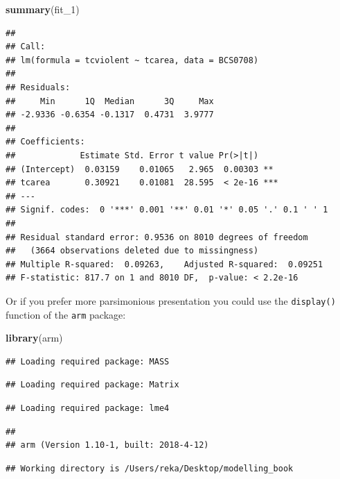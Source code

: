 \documentclass[]{book}
\newenvironment{Shaded}{\begin{snugshade}}{\end{snugshade}}
\newcommand{\DecValTok}[1]{\textcolor[rgb]{0.00,0.00,0.81}{#1}}
\newcommand{\KeywordTok}[1]{\textcolor[rgb]{0.13,0.29,0.53}{\textbf{#1}}}
\newcommand{\NormalTok}[1]{#1}
\theoremstyle{definition}
\theoremstyle{definition}
\theoremstyle{definition}
\theoremstyle{remark}
\begin{document}
\begin{Shaded}
\begin{Highlighting}[]
\KeywordTok{summary}\NormalTok{(fit_}\DecValTok{1}\NormalTok{)}
\end{Highlighting}
\end{Shaded}

\begin{verbatim}
## 
## Call:
## lm(formula = tcviolent ~ tcarea, data = BCS0708)
## 
## Residuals:
##     Min      1Q  Median      3Q     Max 
## -2.9336 -0.6354 -0.1317  0.4731  3.9777 
## 
## Coefficients:
##             Estimate Std. Error t value Pr(>|t|)    
## (Intercept)  0.03159    0.01065   2.965  0.00303 ** 
## tcarea       0.30921    0.01081  28.595  < 2e-16 ***
## ---
## Signif. codes:  0 '***' 0.001 '**' 0.01 '*' 0.05 '.' 0.1 ' ' 1
## 
## Residual standard error: 0.9536 on 8010 degrees of freedom
##   (3664 observations deleted due to missingness)
## Multiple R-squared:  0.09263,    Adjusted R-squared:  0.09251 
## F-statistic: 817.7 on 1 and 8010 DF,  p-value: < 2.2e-16
\end{verbatim}

Or if you prefer more parsimonious presentation you could use the
\texttt{display()} function of the \texttt{arm} package:

\begin{Shaded}
\begin{Highlighting}[]
\KeywordTok{library}\NormalTok{(arm)}
\end{Highlighting}
\end{Shaded}

\begin{verbatim}
## Loading required package: MASS
\end{verbatim}

\begin{verbatim}
## Loading required package: Matrix
\end{verbatim}

\begin{verbatim}
## Loading required package: lme4
\end{verbatim}

\begin{verbatim}
## 
## arm (Version 1.10-1, built: 2018-4-12)
\end{verbatim}

\begin{verbatim}
## Working directory is /Users/reka/Desktop/modelling_book
\end{verbatim}
\end{document}
